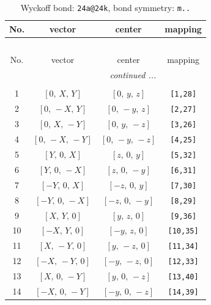 \documentclass[fleqn,8pt]{jsarticle}
\begin{document}
\begin{longtable}{cccc}
\caption{Wyckoff bond: {\tt 24a@24k}, bond symmetry: {\tt m..}}
 \\
 \hline \hline
No. & vector & center & mapping \\ \hline \endfirsthead

\multicolumn{3}{l}{\tablename\ \thetable{}} \\
 \hline \hline
No. & vector & center & mapping \\ \hline \endhead

 \hline \hline
\multicolumn{3}{r}{\footnotesize\it continued ...} \\ \endfoot

 \hline \hline
\multicolumn{3}{r}{} \\ \endlastfoot

1 & $\left[ 0,\, X,\, Y \right]$ & $\left[ 0,\, y,\, z \right]$ & {\tt [1,28]} \\ \hline
2 & $\left[ 0,\, - X,\, Y \right]$ & $\left[ 0,\, - y,\, z \right]$ & {\tt [2,27]} \\ \hline
3 & $\left[ 0,\, X,\, - Y \right]$ & $\left[ 0,\, y,\, - z \right]$ & {\tt [3,26]} \\ \hline
4 & $\left[ 0,\, - X,\, - Y \right]$ & $\left[ 0,\, - y,\, - z \right]$ & {\tt [4,25]} \\ \hline
5 & $\left[ Y,\, 0,\, X \right]$ & $\left[ z,\, 0,\, y \right]$ & {\tt [5,32]} \\ \hline
6 & $\left[ Y,\, 0,\, - X \right]$ & $\left[ z,\, 0,\, - y \right]$ & {\tt [6,31]} \\ \hline
7 & $\left[ - Y,\, 0,\, X \right]$ & $\left[ - z,\, 0,\, y \right]$ & {\tt [7,30]} \\ \hline
8 & $\left[ - Y,\, 0,\, - X \right]$ & $\left[ - z,\, 0,\, - y \right]$ & {\tt [8,29]} \\ \hline
9 & $\left[ X,\, Y,\, 0 \right]$ & $\left[ y,\, z,\, 0 \right]$ & {\tt [9,36]} \\ \hline
10 & $\left[ - X,\, Y,\, 0 \right]$ & $\left[ - y,\, z,\, 0 \right]$ & {\tt [10,35]} \\ \hline
11 & $\left[ X,\, - Y,\, 0 \right]$ & $\left[ y,\, - z,\, 0 \right]$ & {\tt [11,34]} \\ \hline
12 & $\left[ - X,\, - Y,\, 0 \right]$ & $\left[ - y,\, - z,\, 0 \right]$ & {\tt [12,33]} \\ \hline
13 & $\left[ X,\, 0,\, - Y \right]$ & $\left[ y,\, 0,\, - z \right]$ & {\tt [13,40]} \\ \hline
14 & $\left[ - X,\, 0,\, - Y \right]$ & $\left[ - y,\, 0,\, - z \right]$ & {\tt [14,39]} \\ \hline

\end{longtable}
\end{document}
